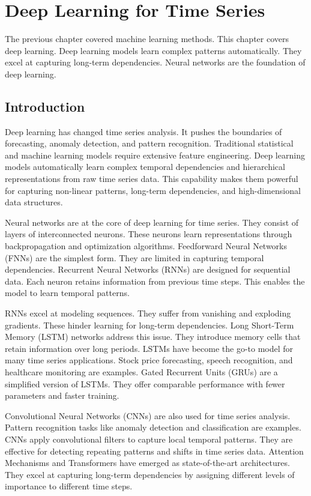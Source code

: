 \chapter{Deep Learning for Time Series}

The previous chapter covered machine learning methods. This chapter covers deep learning. Deep learning models learn complex patterns automatically. They excel at capturing long-term dependencies. Neural networks are the foundation of deep learning.

\section{Introduction}

Deep learning has changed time series analysis. It pushes the boundaries of forecasting, anomaly detection, and pattern recognition. Traditional statistical and machine learning models require extensive feature engineering. Deep learning models automatically learn complex temporal dependencies and hierarchical representations from raw time series data. This capability makes them powerful for capturing non-linear patterns, long-term dependencies, and high-dimensional data structures.

Neural networks are at the core of deep learning for time series. They consist of layers of interconnected neurons. These neurons learn representations through backpropagation and optimization algorithms. Feedforward Neural Networks (FNNs) are the simplest form. They are limited in capturing temporal dependencies. Recurrent Neural Networks (RNNs) are designed for sequential data. Each neuron retains information from previous time steps. This enables the model to learn temporal patterns.

RNNs excel at modeling sequences. They suffer from vanishing and exploding gradients. These hinder learning for long-term dependencies. Long Short-Term Memory (LSTM) networks address this issue. They introduce memory cells that retain information over long periods. LSTMs have become the go-to model for many time series applications. Stock price forecasting, speech recognition, and healthcare monitoring are examples. Gated Recurrent Units (GRUs) are a simplified version of LSTMs. They offer comparable performance with fewer parameters and faster training.

Convolutional Neural Networks (CNNs) are also used for time series analysis. Pattern recognition tasks like anomaly detection and classification are examples. CNNs apply convolutional filters to capture local temporal patterns. They are effective for detecting repeating patterns and shifts in time series data. Attention Mechanisms and Transformers have emerged as state-of-the-art architectures. They excel at capturing long-term dependencies by assigning different levels of importance to different time steps.

